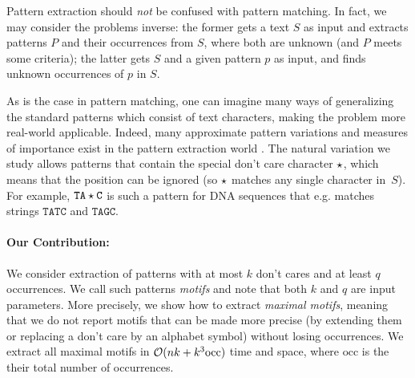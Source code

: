 Pattern extraction should \emph{not} be confused with pattern matching. In fact, we may consider the problems inverse: the former gets a text $S$ as input and extracts patterns $P$ and their occurrences from $S$, where both are unknown (and $P$ meets some criteria); the latter gets $S$ and a given pattern $p$ as input, and finds unknown occurrences of $p$ in $S$.

As is the case in pattern matching, one can imagine many ways of generalizing the standard patterns which consist of text characters, making the problem more real-world applicable. 
Indeed, many approximate pattern variations and measures of importance exist in the pattern extraction world
\cite{CominV13, CunialA12, ApostolicoPU11, rime, Eskin04, IliopoulosMPPRS05, grossi2011madmx, sagot1998spelling, tcsUkkonen09, arimura2007efficient}. The natural variation we study allows patterns that contain the special don't care character $\star$, which means that the position can be ignored (so $\star$ matches any single character in~$S$). For example, $\mathtt{TA}\star\mathtt{C}$ is such a pattern for DNA sequences that e.g. matches strings $\mathtt{TATC}$ and $\mathtt{TAGC}$.


\paragraph{Our Contribution: } 
We consider extraction of patterns with at most $k$ don't cares and at least $q$ occurrences. We call such patterns \emph{motifs} and note that both $k$ and $q$ are input parameters. 
More precisely, we show how to extract \emph{maximal motifs}, meaning that we do not report motifs that can be made more precise (by extending them or replacing a don't care by an alphabet symbol) without losing occurrences. We extract all maximal motifs in $\mathcal{O}(nk + k^3 \textrm{occ})$ time and space, where $\textrm{occ}$ is the their total number of occurrences.

